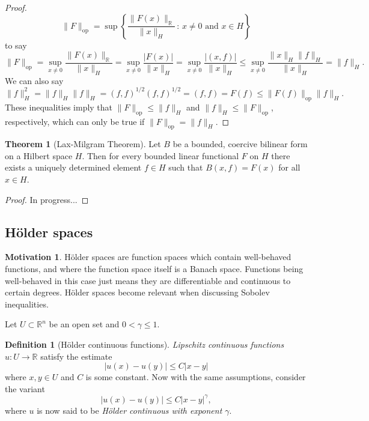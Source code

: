 \documentclass[11pt]{article}
\theoremstyle{definition}
\newtheorem*{theorem}{Theorem}
\newtheorem*{definition}{Definition}
\newtheorem*{motivation}{Motivation}
\begin{document}
\begin{proof}
	\begin{equation*}
		\|F\|_{\text{op}} = \sup\left\{\frac{\|F(x)\|_{\mathbb{R}}}{\|x\|_H}\, : \, x \not= 0 \text{ and } x \in H\right\}
	\end{equation*}
	to say
	\begin{equation*}
		\|F\|_{\text{op}} = \sup_{x\not=0}{\frac{\|F(x)\|_{\mathbb{R}}}{\|x\|_H}} = \sup_{x\not=0}{\frac{|F(x)|}{\|x\|_H}} = \sup_{x\not=0}{\frac{|(x,f)|}{\|x\|_H}} \leq \sup_{x\not=0}{\frac{\|x\|_H\|f\|_H}{\|x\|_H}} = \|f\|_H.
	\end{equation*}
	We can also say
	\begin{equation*}
		\|f\|_H^2 = \|f\|_H\|f\|_H = (f,f)^{1/2}(f,f)^{1/2} = (f,f) = F(f) \leq \|F(f)\|_{\text{op}}\|f\|_H.
	\end{equation*}
	These inequalities imply that $\|F\|_{\text{op}} \leq \|f\|_H$ and $\|f\|_H \leq \|F\|_{\text{op}}$, respectively, which can only be true if $\|F\|_{\text{op}} = \|f\|_H$.
\end{proof}

\begin{theorem}[Lax-Milgram Theorem]
	Let $B$ be a bounded, coercive bilinear form on a Hilbert space $H$. Then for every bounded linear functional $F$ on $H$
	there exists a uniquely determined element $f\in H$ such that $B(x,f) = F(x)$ for all $x \in H$.
\end{theorem}
\begin{proof}
	In progress...
\end{proof}

\newpage

\subsection{H\"{o}lder spaces}
\begin{motivation}
	H\"{o}lder spaces are function spaces which contain well-behaved functions, and where the function space itself is a Banach space.
	Functions being well-behaved in this case just means they are differentiable and continuous to certain degrees.
	H\"{o}lder spaces become relevant when discussing Sobolev inequalities.
\end{motivation}
Let $U \subset \mathbb{R}^n$ be an open set and $0 < \gamma \leq 1$.
\begin{definition}[H\"{o}lder continuous functions]
\textit{Lipschitz continuous functions} $u : U \rightarrow \mathbb{R}$
satisfy the estimate
\[|u(x) - u(y)| \leq C|x-y|\]
where $x,y \in U$ and $C$ is some constant.
Now with the same assumptions, consider the variant
\[|u(x) - u(y)| \leq C|x-y|^{\gamma},\]
where $u$ is now said to be \textit{H\"{o}lder continuous with exponent $\gamma$}.
\end{definition}
\end{document}

